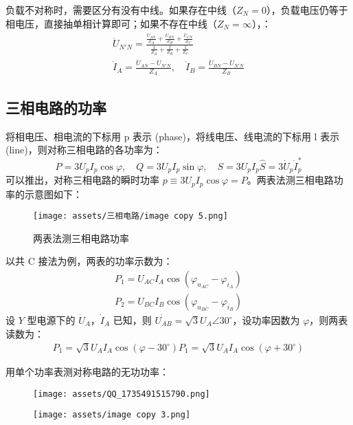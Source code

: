 \documentclass[a4paper]{article}  %
\theoremstyle{MyLineTheoremStyle} %
\theoremstyle{MyBlockTheoremStyle} %
\theoremstyle{MySubsubsectionStyle} %
\begin{document}
\begin{multicols*}{4}
负载不对称时，需要区分有没有中线。如果存在中线（$Z_N = 0$），负载电压仍等于相电压，直接抽单相计算即可；如果不存在中线（$Z_N = \infty$），：
\begin{gather}
\dot{U}_{N'N} = \frac{ \frac{\dot{U}_{AN}}{Z_A} + \frac{\dot{U}_{BN}}{Z_B} + \frac{\dot{U}_{CN}}{Z_C}  }{ \frac{1}{Z_A} + \frac{1}{Z_B} + \frac{1}{Z_C} } \\
\dot{I}_{A} = \frac{\dot{U}_{AN} - \dot{U}_{N'N} }{Z_A}, \quad 
\dot{I}_{B} = \frac{\dot{U}_{BN} - \dot{U}_{N'N} }{Z_B}
\end{gather}

\subsection{三相电路的功率}

将相电压、相电流的下标用 p 表示 (phase)，将线电压、线电流的下标用 l 表示 (line)，则对称三相电路的各功率为：
\begin{equation}
P = 3 U_p I_p \cos \varphi,\quad 
Q = 3 U_p I_p \sin \varphi,\quad
S = 3 U_p I_p
\hat{S} = 3 \dot{U}_p \dot{I}_p^*
\end{equation}
可以推出，对称三相电路的瞬时功率 $p \equiv 3 U_p I_p \cos \varphi = P$。两表法测三相电路功率的示意图如下：
\begin{figure}[H]\centering
    \texttt{[image: assets/三相电路/image copy 5.png]}
    \caption{两表法测三相电路功率}
\end{figure}

以共 C 接法为例，两表的功率示数为：
\begin{gather}
P_1 = U_{AC} I_A \cos (\varphi_{u_{AC}} - \varphi_{i_A})\\
P_2 = U_{BC} I_B \cos (\varphi_{u_{BC}} - \varphi_{i_B})
\end{gather}
设 $Y$ 型电源下的 $\dot{U}_A$，$\dot{I}_A$ 已知，则 $\dot{U_{AB}} = \sqrt{3} U_A \angle 30^\circ$，设功率因数为 $\varphi$，则两表读数为：
\begin{gather}
P_1 = \sqrt{3} U_A I_A \cos (\varphi - 30^\circ)
P_1 = \sqrt{3} U_A I_A \cos (\varphi + 30^\circ)
\end{gather}

用单个功率表测对称电路的无功功率：
\begin{figure}[H]\centering
    \texttt{[image: assets/QQ\_1735491515790.png]}
\end{figure}
\begin{figure}[H]\centering
    \texttt{[image: assets/image copy 3.png]}
\end{figure}






\end{multicols*}
\end{document}
